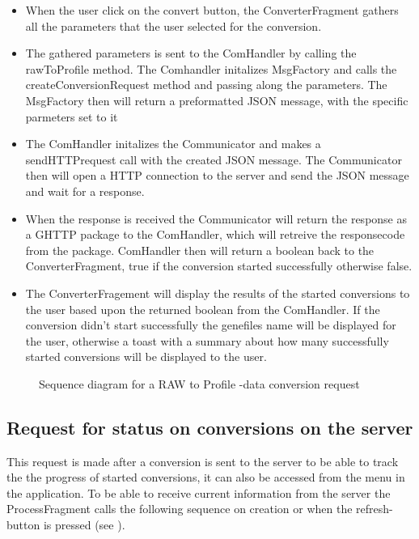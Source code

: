     \begin{itemize}
    	
        \item
        	When the user click on the convert button, the ConverterFragment gathers all the parameters that the user selected for the conversion.
      	\item
        	The gathered parameters is sent to the ComHandler by calling the rawToProfile method. The Comhandler initalizes MsgFactory and calls the createConversionRequest method and passing along the parameters. The MsgFactory then will return a preformatted JSON message, with the specific parmeters set to it
     	\item
        	The ComHandler initalizes the Communicator and makes a sendHTTPrequest call with the created JSON message. The Communicator then will open a HTTP connection to the server and send the JSON message and wait for a response.
    	\item
        	When the response is received the Communicator will return the response as a GHTTP package to the ComHandler, which will retreive the responsecode from the package. ComHandler then will return a boolean back to the ConverterFragment, true if the conversion started successfully otherwise false.
     	\item
        	The ConverterFragement will display the results of the started conversions to the user based upon the returned boolean from the ComHandler. If the conversion didn't start successfully the genefiles name will be displayed for the user, otherwise a toast with a summary about how many successfully started conversions will be displayed to the user.
    \end{itemize}
    
	\begin{figure}
        \caption{Sequence diagram for a RAW to Profile -data conversion request}
        \label{fig:and_convertseq}
 	\end{figure}
   \FloatBarrier

\subsection{Request for status on conversions on the server}
	This request is made after a conversion is sent to the server to be able to track the the progress of started conversions, it can also be accessed from the menu in the application. To be able to receive current information from the server the ProcessFragment calls the following sequence on creation or when the refresh-button is pressed (see ).
    
